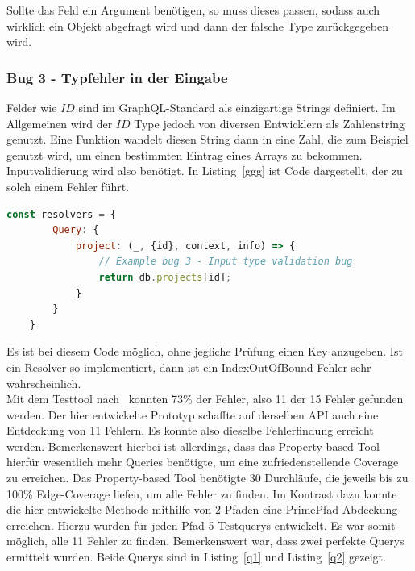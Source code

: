 Sollte das Feld ein Argument benötigen, so muss dieses passen, sodass auch wirklich ein Objekt abgefragt wird und dann der falsche Type zurückgegeben wird.

\subsubsection{Bug 3 - Typfehler in der Eingabe}

Felder wie $ID$ sind im GraphQL-Standard als einzigartige Strings definiert.
Im Allgemeinen wird der $ID$ Type jedoch von diversen Entwicklern als Zahlenstring genutzt.
Eine Funktion wandelt diesen String dann in eine Zahl, die zum Beispiel genutzt wird, um einen bestimmten Eintrag eines Arrays zu bekommen.
Inputvalidierung wird also benötigt.
In Listing~\ref{ggg} ist Code dargestellt, der zu solch einem Fehler führt.

\begin{lstlisting}[language=javascript, caption={Code ohne Inputvalidierung}, label={ggg}]
    const resolvers = {
        Query: {
            project: (_, {id}, context, info) => {
                // Example bug 3 - Input type validation bug
                return db.projects[id];
            }
        }
    }
\end{lstlisting}

Es ist bei diesem Code möglich, ohne jegliche Prüfung einen Key anzugeben.
Ist ein Resolver so implementiert, dann ist ein IndexOutOfBound Fehler sehr wahrscheinlich.
\\


Mit dem Testtool nach~\cite[Property-based Testing]{property-based-testing} konnten 73\% der Fehler, also 11 der 15 Fehler gefunden  werden.
Der hier entwickelte Prototyp schaffte auf derselben API auch eine Entdeckung von 11 Fehlern.
Es konnte also dieselbe Fehlerfindung erreicht werden.
Bemerkenswert hierbei ist allerdings, dass das Property-based Tool hierfür wesentlich mehr Queries benötigte, um eine zufriedenstellende Coverage zu erreichen.
Das Property-based Tool benötigte 30 Durchläufe, die jeweils bis zu 100\% Edge-Coverage liefen, um alle Fehler zu finden.
Im Kontrast dazu konnte die hier entwickelte Methode mithilfe von 2 Pfaden eine PrimePfad Abdeckung erreichen.
Hierzu wurden für jeden Pfad 5 Testquerys entwickelt.
Es war somit möglich, alle 11 Fehler zu finden.
Bemerkenswert war, dass zwei perfekte Querys ermittelt wurden.
Beide Querys sind in Listing~\ref{q1} und Listing~\ref{q2} gezeigt. \\

